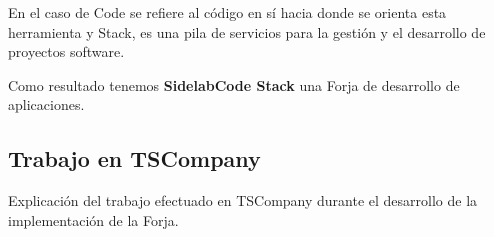 \par En el caso de Code se refiere al código en sí hacia donde se orienta esta herramienta y Stack, es una pila de servicios para la gestión y el desarrollo de proyectos software.

\par Como resultado tenemos \textbf{SidelabCode Stack} una Forja de desarrollo de aplicaciones.


\subsection{Trabajo en TSCompany}
\label{sub:trabajo-tscompany}

\par Explicación del trabajo efectuado en TSCompany durante el desarrollo de la implementación de la Forja.

